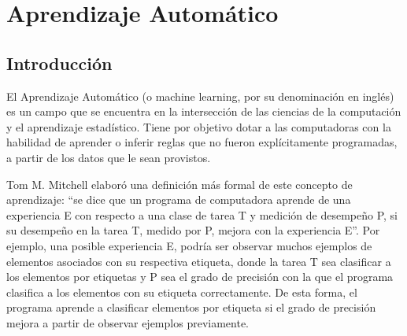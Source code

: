 \documentclass[a4paper,11pt,spanish]{book}
\begin{document}



  \section{Aprendizaje Automático}
    \subsection{Introducción}
      El Aprendizaje Automático (o machine learning, por su denominación en inglés) es un campo que se encuentra en la intersección de las ciencias de la computación
      y el aprendizaje estadístico. 
      Tiene por objetivo dotar a las computadoras con la habilidad de aprender o inferir reglas que no fueron explícitamente programadas, a partir
      de los datos que le sean provistos.

      Tom M. Mitchell  \cite{Mitchell:1997:ML:541177} elaboró una definición más formal de este concepto de aprendizaje: “se dice que un programa de computadora aprende de una experiencia E con 
      respecto a una clase de tarea T y medición de desempeño P, si su desempeño en la tarea T, medido por P, mejora con la experiencia E”. 
      Por ejemplo, una posible experiencia E, podría ser observar muchos ejemplos de elementos asociados con su respectiva etiqueta, donde la tarea T sea clasificar a los 
      elementos por etiquetas y P sea el grado de precisión con la que el programa clasifica a los elementos con su etiqueta correctamente. 
      De esta forma, el programa aprende a clasificar elementos por etiqueta si el grado de precisión mejora a partir de observar ejemplos previamente.
\end{document}
